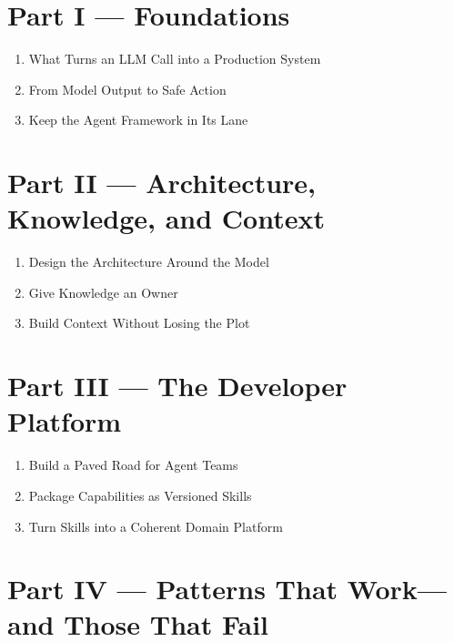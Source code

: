 
\section{Part I — Foundations}

\begin{enumerate}

\item What Turns an LLM Call into a Production System

\item From Model Output to Safe Action

\item Keep the Agent Framework in Its Lane

\end{enumerate}

\section{Part II — Architecture, Knowledge, and Context}

\begin{enumerate}

\item Design the Architecture Around the Model

\item Give Knowledge an Owner

\item Build Context Without Losing the Plot

\end{enumerate}

\section{Part III — The Developer Platform}

\begin{enumerate}

\item Build a Paved Road for Agent Teams

\item Package Capabilities as Versioned Skills

\item Turn Skills into a Coherent Domain Platform

\end{enumerate}

\section{Part IV — Patterns That Work—and Those That Fail}

